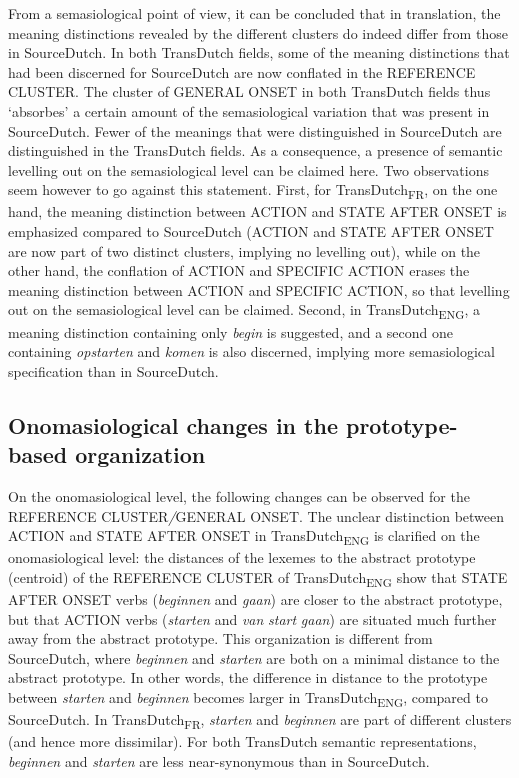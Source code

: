 From a semasiological point of view, it can be concluded that in translation, the meaning distinctions revealed by the different clusters do indeed differ from those in SourceDutch. In both TransDutch fields, some of the meaning distinctions that had been discerned for SourceDutch are now conflated in the REFERENCE CLUSTER. The cluster of GENERAL ONSET in both TransDutch fields thus ‘absorbes’ a certain amount of the semasiological variation that was present in SourceDutch. Fewer of the meanings that were distinguished in SourceDutch are distinguished in the TransDutch fields. As a consequence, a presence of semantic levelling out on the semasiological level can be claimed here. Two observations seem however to go against this statement. First, for TransDutch\textsubscript{FR}, on the one hand, the meaning distinction between ACTION and STATE AFTER ONSET is emphasized compared to SourceDutch (ACTION and STATE AFTER ONSET are now part of two distinct clusters, implying no levelling out), while on the other hand, the conflation of ACTION and {SPECIFIC} ACTION erases the meaning distinction between ACTION and {SPECIFIC} ACTION, so that levelling out on the semasiological level can be claimed. Second, in TransDutch\textsubscript{ENG}, a meaning distinction containing only \textit{begin} is suggested, and a second one containing \textit{opstarten} and \textit{komen} is also discerned, implying more semasiological specification than in SourceDutch.

\subsection{Onomasiological changes in the prototype-based organization}
\label{sec:4.5.2}  
On the onomasiological level, the following changes can be observed for the REFERENCE CLUSTER\textit{/}GENERAL ONSET. The unclear distinction between ACTION and STATE AFTER ONSET in TransDutch\textsubscript{ENG} is clarified on the onomasiological level: the distances of the lexemes to the abstract prototype (centroid) of the REFERENCE CLUSTER of TransDutch\textsubscript{ENG} show that STATE AFTER ONSET verbs (\textit{beginnen} and \textit{gaan}) are closer to the abstract prototype, but that ACTION verbs (\textit{starten} and \textit{van} \textit{start} \textit{gaan}) are situated much further away from the abstract prototype. This organization is different from SourceDutch, where \textit{beginnen} and \textit{starten} are both on a minimal distance to the abstract prototype. In other words, the difference in distance to the prototype between \textit{starten} and \textit{beginnen} becomes larger in TransDutch\textsubscript{ENG}, compared to SourceDutch. In TransDutch\textsubscript{FR}, \textit{starten} and \textit{beginnen} are part of different clusters (and hence more dissimilar). For both TransDutch semantic representations, \textit{beginnen} and \textit{starten} are less near-synonymous than in SourceDutch.

